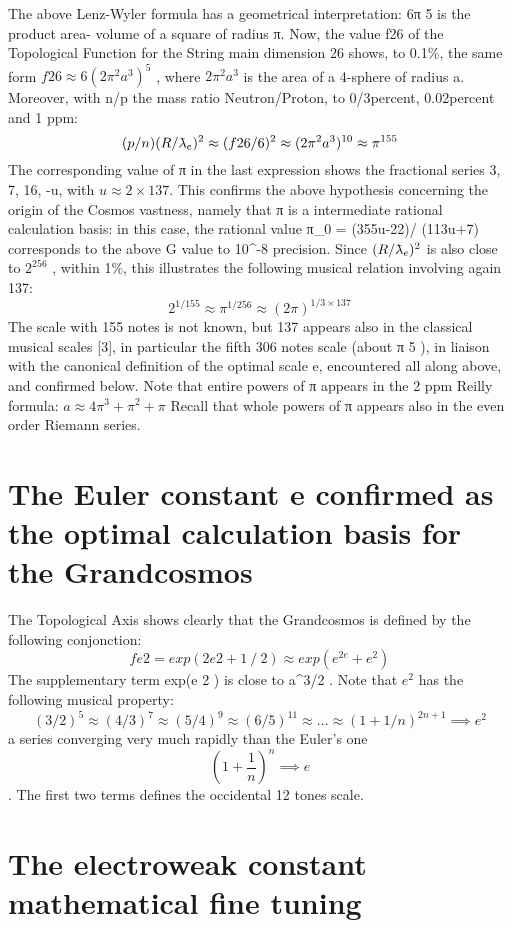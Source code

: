 The above Lenz-Wyler formula has a geometrical interpretation: 6π 5 is the product area-
volume of a square of radius π. Now, the value f{26} of the Topological Function for the String
main dimension 26 shows, to 0.1\%, the same form $f{26} \approx 6(2\pi^{2} a^{3} )^{5}$ , where $2π^{2}a^{3}$ is the area of a
4-sphere of radius a. Moreover, with n/p the mass ratio Neutron/Proton, to 0/3{percent}, 0.02{percent} and 1
ppm:
$$(p/n) (R/\lambdabar_{e})^{2} \approx (f{26}/6)^{2} \approx (2\pi^{2} a^{3})^{10} \approx \pi^{155}$$
The corresponding value of π in the last expression shows the fractional series 3, 7, 16, -u, with $u \approx
2 \times 137$. This confirms the above hypothesis concerning the origin of the Cosmos vastness, namely
that π is a intermediate rational calculation basis: in this case, the rational value π_{0} = (355u-22)/
(113u+7) corresponds to the above G value to 10^{-8} precision.
Since $(R/\lambdabar_e )^{2}$ is also close to $2^{256}$ , within 1\%, this illustrates the following musical relation
involving again 137:
$$2^{1/155} \approx \pi^{1/256} \approx (2\pi)^{1/3 \times 137}$$
The scale with 155 notes is not known, but 137 appears also in the classical musical scales [3], in
particular the fifth 306 notes scale (about π 5 ), in liaison with the canonical definition of the optimal
scale e, encountered all along above, and confirmed below.
Note that entire powers of π appears in the 2 ppm Reilly formula: $a \approx 4\pi^{3} + \pi^{2} + \pi$
Recall that whole powers of π appears also in the even order Riemann series.

\section {The Euler constant e confirmed as the optimal calculation basis for the Grandcosmos}

The Topological Axis shows clearly that the Grandcosmos is defined by the following
conjonction:
$$f{e 2 } = exp(2 e2 + 1⁄2 ) \approx exp(e^{2e} + e^{2} )$$
The supplementary term exp(e 2 ) is close to a^{3/2} . Note that $e^{2}$ has the following musical property:
$$(3/2)^{5} \approx (4/3)^{7} \approx (5/4)^{9} \approx (6/5)^{11} \approx ... \approx (1+1/n)^{2n+1} \implies e^{2}$$
a series converging very much rapidly than the Euler's one $$(1+\frac{1}{n})^{n} \implies e$$. The first two terms defines
the occidental 12 tones scale.

\section {The electroweak constant mathematical fine tuning}

